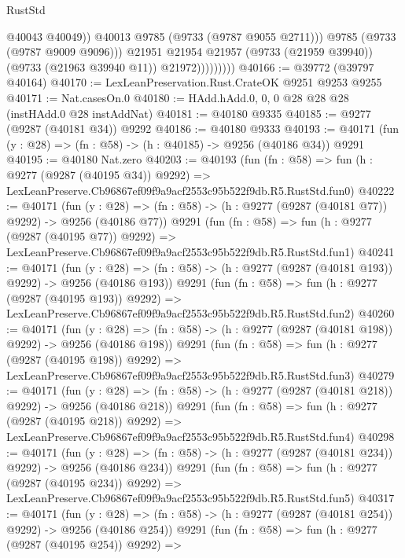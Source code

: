 \begin{lexlean}{RustStd}
\begin{coremodule}
                              @40043
                              @40049))
                          @40013
                          @9785
                          (@9733 (@9787 @9055 @2711)))
                        @9785
                        (@9733 (@9787 @9009 @9096)))
                      @21951
                      @21954
                      @21957
                      (@9733 (@21959 @39940))
                      (@9733 (@21963 @39940 @11))
                      @21972)))))))))
@40166 := @39772 (@39797 @40164)
@40170 := LexLeanPreservation.Rust.CrateOK @9251 @9253 @9255
@40171 := Nat.casesOn.{0}
@40180 := HAdd.hAdd.{0, 0, 0} @28 @28 @28 (instHAdd.{0} @28 instAddNat)
@40181 := @40180 @9335
@40185 := @9277 (@9287 (@40181 @34)) @9292
@40186 := @40180 @9333
@40193 := @40171 (fun (y : @28) => (fn : @58) -> (h : @40185) -> @9256 (@40186 @34)) @9291
@40195 := @40180 Nat.zero
@40203 := @40193
    (fun (fn : @58) =>
    fun (h : @9277 (@9287 (@40195 @34)) @9292) =>
    LexLeanPreserve.Cb96867ef09f9a9acf2553c95b522f9db.R5.RustStd.fun0)
@40222 := @40171
    (fun (y : @28) => (fn : @58) -> (h : @9277 (@9287 (@40181 @77)) @9292) -> @9256 (@40186 @77))
    @9291
    (fun (fn : @58) =>
    fun (h : @9277 (@9287 (@40195 @77)) @9292) =>
    LexLeanPreserve.Cb96867ef09f9a9acf2553c95b522f9db.R5.RustStd.fun1)
@40241 := @40171
    (fun (y : @28) => (fn : @58) -> (h : @9277 (@9287 (@40181 @193)) @9292) -> @9256 (@40186 @193))
    @9291
    (fun (fn : @58) =>
    fun (h : @9277 (@9287 (@40195 @193)) @9292) =>
    LexLeanPreserve.Cb96867ef09f9a9acf2553c95b522f9db.R5.RustStd.fun2)
@40260 := @40171
    (fun (y : @28) => (fn : @58) -> (h : @9277 (@9287 (@40181 @198)) @9292) -> @9256 (@40186 @198))
    @9291
    (fun (fn : @58) =>
    fun (h : @9277 (@9287 (@40195 @198)) @9292) =>
    LexLeanPreserve.Cb96867ef09f9a9acf2553c95b522f9db.R5.RustStd.fun3)
@40279 := @40171
    (fun (y : @28) => (fn : @58) -> (h : @9277 (@9287 (@40181 @218)) @9292) -> @9256 (@40186 @218))
    @9291
    (fun (fn : @58) =>
    fun (h : @9277 (@9287 (@40195 @218)) @9292) =>
    LexLeanPreserve.Cb96867ef09f9a9acf2553c95b522f9db.R5.RustStd.fun4)
@40298 := @40171
    (fun (y : @28) => (fn : @58) -> (h : @9277 (@9287 (@40181 @234)) @9292) -> @9256 (@40186 @234))
    @9291
    (fun (fn : @58) =>
    fun (h : @9277 (@9287 (@40195 @234)) @9292) =>
    LexLeanPreserve.Cb96867ef09f9a9acf2553c95b522f9db.R5.RustStd.fun5)
@40317 := @40171
    (fun (y : @28) => (fn : @58) -> (h : @9277 (@9287 (@40181 @254)) @9292) -> @9256 (@40186 @254))
    @9291
    (fun (fn : @58) =>
    fun (h : @9277 (@9287 (@40195 @254)) @9292) =>

\end{coremodule}
\end{lexlean}
